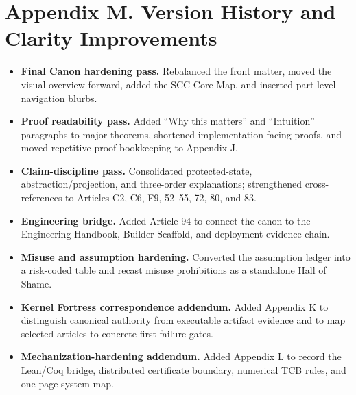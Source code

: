 \documentclass[10pt,oneside]{article}
\theoremstyle{definition}
\theoremstyle{remark}
\begin{document}
\section{Appendix M. Version History and Clarity Improvements}
\begin{itemize}
  \item \textbf{Final Canon hardening pass.} Rebalanced the front matter, moved the visual overview forward, added the SCC Core Map, and inserted part-level navigation blurbs.
  \item \textbf{Proof readability pass.} Added ``Why this matters'' and ``Intuition'' paragraphs to major theorems, shortened implementation-facing proofs, and moved repetitive proof bookkeeping to Appendix J.
  \item \textbf{Claim-discipline pass.} Consolidated protected-state, abstraction/projection, and three-order explanations; strengthened cross-references to Articles C2, C6, F9, 52--55, 72, 80, and 83.
  \item \textbf{Engineering bridge.} Added Article 94 to connect the canon to the Engineering Handbook, Builder Scaffold, and deployment evidence chain.
  \item \textbf{Misuse and assumption hardening.} Converted the assumption ledger into a risk-coded table and recast misuse prohibitions as a standalone Hall of Shame.
  \item \textbf{Kernel Fortress correspondence addendum.} Added Appendix K to distinguish canonical authority from executable artifact evidence and to map selected articles to concrete first-failure gates.
  \item \textbf{Mechanization-hardening addendum.} Added Appendix L to record the Lean/Coq bridge, distributed certificate boundary, numerical TCB rules, and one-page system map.
\end{itemize}
\end{document}
